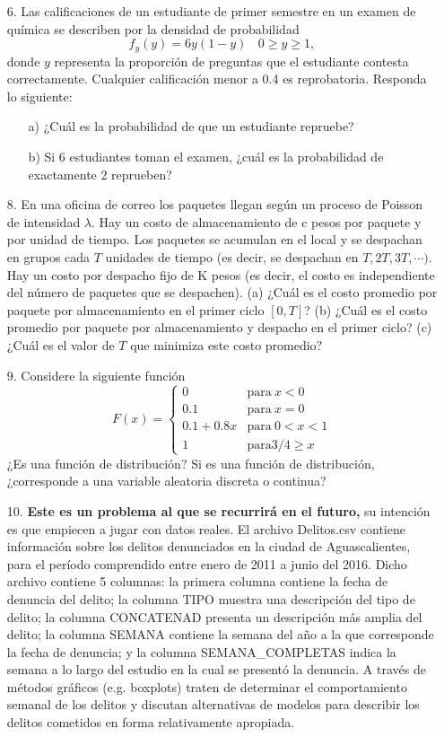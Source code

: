 \documentclass[11pt,letterpaper]{article}
\begin{document}
\begin{itemize}
\item[6.] Las calificaciones de un estudiante de primer semestre en un examen de química se describen
por la densidad de probabilidad
$$f_y(y)=6y(1-y)\ \ \ \ 0\geq y \geq 1,$$
donde $y$ representa la proporción de preguntas que el estudiante contesta correctamente. Cualquier calificación menor a 0.4 es reprobatoria. Responda lo siguiente:
\begin{itemize}
\item[a)] ¿Cuál es la probabilidad de que un estudiante repruebe?
\item[b)] Si 6 estudiantes toman el examen, ¿cuál es la probabilidad de exactamente 2 reprueben?
\end{itemize}

\item[8.] En una oficina de correo los paquetes llegan según un proceso de Poisson de intensidad $\lambda$. Hay un costo de almacenamiento de c pesos por paquete y por unidad de tiempo. Los paquetes se acumulan en el local y se despachan en grupos cada $T$ unidades de tiempo (es decir, se despachan en $T , 2T , 3T , \cdots)$. Hay un costo por despacho fijo de K pesos (es decir, el costo es independiente del número de paquetes que se despachen). (a) ¿Cuál es el costo promedio por paquete por almacenamiento en el primer ciclo $[0, T ]$? (b) ¿Cuál es el costo promedio por paquete por almacenamiento y despacho en el primer ciclo? (c) ¿Cuál es el valor de $T$ que minimiza este costo promedio?


\item[9.] Considere la siguiente función
\begin{equation*}
F(x)=\left\{ \begin{array}{cl}
0 & \text{para} \ x<0\\
0.1 & \text{para} \ x=0\\
0.1+0.8x & \text{para} \ 0<x<1\\
1 & \text{para} 3/4\geq x
\end{array} \right.
\end{equation*}
¿Es una función de distribución? Si es una función de distribución, ¿corresponde a una variable
aleatoria discreta o continua?

\item[10.] \textbf{Este es un problema al que se recurrirá en el futuro,} su intención es que empiecen a jugar con datos reales. El archivo \textsf{ Delitos.csv} contiene información sobre los delitos denunciados en la ciudad de Aguascalientes, para el período comprendido entre enero de 2011 a junio del 2016. Dicho archivo contiene 5 columnas: la primera columna contiene la fecha de denuncia del delito; la columna TIPO muestra una descripción del tipo de delito; la columna CONCATENAD presenta un descripción más amplia del delito; la columna SEMANA contiene la semana del año a la que corresponde la fecha de denuncia; y la columna SEMANA\_COMPLETAS indica la semana a lo largo del estudio en la cual se presentó la denuncia. A través de métodos gráficos (e.g. boxplots) traten de determinar el comportamiento semanal de los delitos y discutan alternativas de modelos para describir los delitos cometidos en forma relativamente apropiada.
\end{itemize}
\end{document}
